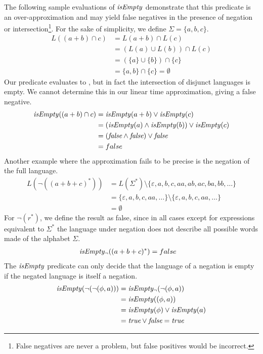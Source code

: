 \needspace{3cm}
\begin{eg}
   The following sample evaluations of $\mathit{isEmpty}$ demonstrate that this
   predicate is an over-approximation and may yield false negatives in the
   presence of negation or intersection\footnote{False negatives are never a
   problem, but false positives would be incorrect.}. For the sake of
   simplicity, we define $\Sigma = \{a,b,c\}$.
   \begin{align*}
      L((a+b) \cap c) &= L(a+b) \cap L(c) \\
      &= (L(a) \cup L(b)) \cap L(c) \\
      &= (\{a\} \cup \{b\}) \cap \{c\} \\
      &= \{a,b\} \cap \{c\} = \emptyset
   \end{align*}
   Our predicate evaluates to \false, but in fact the intersection of disjunct
   languages is empty. We cannot determine this in our linear time
   approximation, giving a false negative.
   \begin{align*}
      \mathit{isEmpty}((a+b) \cap c) &= \mathit{isEmpty}(a+b) \vee \mathit{isEmpty}(c) \\
      &= (\mathit{isEmpty}(a) \wedge \mathit{isEmpty}(b)) \vee \mathit{isEmpty}(c) \\
      &= (\textit{false} \wedge \textit{false}) \vee \textit{false} \\
      &= false
   \end{align*}
   Another example where the approximation fails to be precise is the negation
   of the full language.
   \begin{align*}
      L(\neg((a+b+c)^*)) &= L(\Sigma^*) \setminus \{\varepsilon,a,b,c,aa,ab,ac,ba,bb,\dots\} \\
      &= \{\varepsilon,a,b,c,aa,\dots\} \setminus \{\varepsilon,a,b,c,aa,\dots\} \\
      &= \emptyset
   \end{align*}
   For $\neg(r^*)$, we define the result as false, since in all cases except for
   expressions equivalent to $\Sigma^*$ the language under negation does not
   describe all possible words made of the alphabet $\Sigma$.
   \begin{align*}
      \mathit{isEmpty_\neg}((a+b+c)^*) &= false
   \end{align*}
   The $\mathit{isEmpty}$ predicate can only decide that the language of a negation is
   empty if the negated language is itself a negation.
   \begin{align*}
      \mathit{isEmpty}(\neg(\neg(\phi,a))) &= \mathit{isEmpty_\neg}(\neg(\phi,a)) \\
      &= \mathit{isEmpty}((\phi,a)) \\
      &= \mathit{isEmpty}(\phi) \vee \mathit{isEmpty}(a) \\
      &= \textit{true} \vee \textit{false} = \textit{true}
   \end{align*}
\end{eg}


